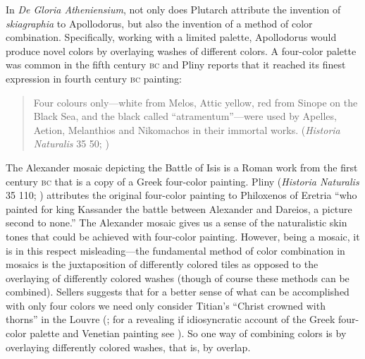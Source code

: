 In \emph{De Gloria Atheniensium}, not only does Plutarch attribute the invention of \emph{skiagraphia} to Apollodorus, but also the invention of a method of color combination. Specifically, working with a limited palette, Apollodorus would produce novel colors by overlaying washes of different colors. A four-color palette was common in the fifth century \textsc{bc} and  Pliny reports that it reached its finest expression in fourth century \textsc{bc} painting:
\begin{quote}
	Four colours only---white from Melos, Attic yellow, red from Sinope on the Black Sea, and the black called ``atramentum''---were used by Apelles, Aetion, Melanthios and Nikomachos in their immortal works. (\emph{Historia Naturalis} 35 50; \citealt[97]{Jex-Blake:1896uq})
\end{quote}
The Alexander mosaic depicting the Battle of Isis is a Roman work from the first century \textsc{bc} that is a copy of a Greek four-color painting. Pliny (\emph{Historia Naturalis} 35 110; \citealt[143]{Jex-Blake:1896uq}) attributes the original four-color painting to Philoxenos of Eretria ``who painted for king Kassander the battle between Alexander and Dareios, a picture second to none.'' The Alexander mosaic gives us a sense of the naturalistic skin tones that could be achieved with four-color painting. However, being a mosaic, it is in this respect misleading---the fundamental method of color combination in mosaics is the juxtaposition of differently colored tiles as opposed to the overlaying of differently colored washes (though of course these methods can be combined). Sellers suggests that for a better sense of what can be accomplished with only four colors we need only consider Titian's ``Christ crowned with thorns'' in the Louvre (\citealt[97 note]{Jex-Blake:1896uq}; for a revealing if idiosyncratic account of the Greek four-color palette and Venetian painting see \citealt{Pavey:1956fk}). So one way of combining colors is by overlaying differently colored washes, that is, by overlap.

